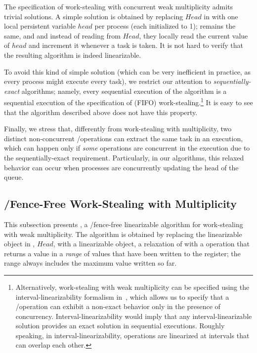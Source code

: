 The specification of work-stealing with concurrent weak multiplicity admits trivial solutions. A simple solution is obtained by replacing \(Head\) in \WFWSM with one local persistent variable \(head\) per process (each initialized to 1); \Put remains the same, and \Take and \Steal instead of reading from \(Head\), they locally read the current value of \(head\) and increment it whenever a task is taken. It is not hard to verify that the resulting algorithm is indeed linearizable.

To avoid this kind of simple solution (which can be very inefficient in practice, as every process might execute every task), we restrict our attention to \textit{sequentially-exact} algorithms; namely, every sequential execution of the algorithm is a sequential execution of the specification of (FIFO) work-stealing.\footnote{Alternatively, work-stealing with weak multiplicity can be specified using the interval-linearizability formalism in~\cite{DBLP_journals_jacm_CastanedaRR18}, which allows us to specify that a \Take/\Steal operation can exhibit a non-exact behavior only in the presence of concurrency. Interval-linearizability would imply that any interval-linearizable solution provides an exact solution in sequential executions. Roughly speaking, in interval-linearizability, operations are linearized at intervals that can overlap each other.}  It is easy to see that the algorithm described above does not have this property.

Finally, we stress that, differently from work-stealing with multiplicity, two distinct non-concurrent \Take/\Steal operations can extract the same task in an execution, which can happen only if \emph{some} operations are concurrent in the execution due to the sequentially-exact requirement. Particularly, in our algorithms, this relaxed behavior can occur when processes are concurrently updating the head of the queue.


\subsection{\label{sec-ws-mult-read-write}\R/\W Fence-Free Work-Stealing with Multiplicity}


This subsection presents \NCWSM, a \R/\W fence-free linearizable algorithm for work-stealing with weak multiplicity. The algorithm is obtained by replacing the linearizable \MaxReg object in \WFWSM, $Head$, with a linearizable \RangeMaxReg object, a relaxation of \MaxReg with a \RMaxR operation that returns a value in a \emph{range} of values that have been written to the register; the range always includes the maximum value written so far.

